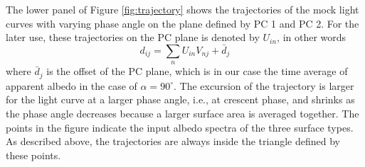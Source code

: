 \documentclass[iop,numberedappendix,apj,]{emulateapj}
\begin{document}
The lower panel of Figure \ref{fig:trajectory} shows the trajectories of the mock light curves with varying phase angle on the plane defined by PC 1 and PC 2. 
For the later use, these trajectories on the PC plane is denoted by $U_{in}$, in other words 
\begin{equation}
d_{ij} = \sum_n U_{in} V_{nj} + \bar d_j
\end{equation}
where $\bar d_j$ is the offset of the PC plane, which is in our case the time average of apparent albedo in the case of $\alpha = 90^{\circ }$. 
The excursion of the trajectory is larger for the light curve at a larger phase angle, i.e., at crescent phase, and shrinks as the phase angle decreases because a larger surface area is averaged together.  
The points in the figure indicate the input albedo spectra of the three surface types. 
As described above, the trajectories are always inside the triangle defined by these points. 



 
\end{document}
